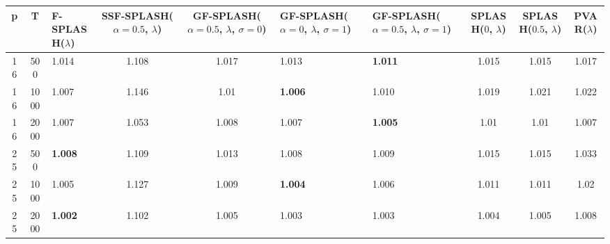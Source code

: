 \begin{tabular}{cclccllccc}
\hline
  p  &  T   & F-SPLASH($\lambda$)   &  SSF-SPLASH($\alpha=0.5$, $\lambda$)  &  GF-SPLASH($\alpha=0.5$, $\lambda$, $\sigma=0$)  & GF-SPLASH($\alpha=0$, $\lambda$, $\sigma=1$)   & GF-SPLASH($\alpha=0.5$, $\lambda$, $\sigma=1$)   &  SPLASH($0$, $\lambda$)  &  SPLASH($0.5$, $\lambda$)  &  PVAR($\lambda$)  \\
\hline
 16  & 500  & 1.014                 &                 1.108                 &                      1.017                       & 1.013                                          & \textbf{1.011}                                   &          1.015           &           1.015            &       1.017       \\
 16  & 1000 & 1.007                 &                 1.146                 &                       1.01                       & \textbf{1.006}                                 & 1.010                                            &          1.019           &           1.021            &       1.022       \\
 16  & 2000 & 1.007                 &                 1.053                 &                      1.008                       & 1.007                                          & \textbf{1.005}                                   &           1.01           &            1.01            &       1.007       \\
 25  & 500  & \textbf{1.008}        &                 1.109                 &                      1.013                       & 1.008                                          & 1.009                                            &          1.015           &           1.015            &       1.033       \\
 25  & 1000 & 1.005                 &                 1.127                 &                      1.009                       & \textbf{1.004}                                 & 1.006                                            &          1.011           &           1.011            &       1.02        \\
 25  & 2000 & \textbf{1.002}        &                 1.102                 &                      1.005                       & 1.003                                          & 1.003                                            &          1.004           &           1.005            &       1.008       \\
\hline
\end{tabular}